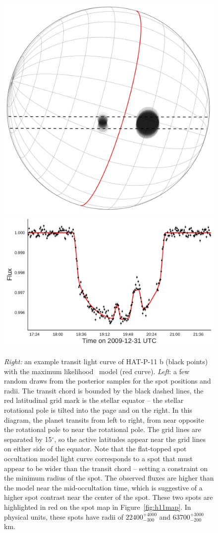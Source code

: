 \begin{figure}
\centering
\includegraphics[scale=0.4]{stsp_hat_p_11/transit044.pdf}
\includegraphics[scale=0.45]{stsp_hat_p_11/lc_044.pdf}
\caption{\textit{Right:} an example transit light curve of HAT-P-11 b (black points) with the maximum likelihood \stsp\ model (red curve). \textit{Left}: a few random draws from the posterior samples for the spot positions and radii. The transit chord is bounded by the black dashed lines, the red latitudinal grid mark is the stellar equator -- the stellar rotational pole is tilted into the page and on the right. In this diagram, the planet transits from left to right, from near opposite the rotational pole to near the rotational pole. The grid lines are separated by 15$^\circ$, so the active latitudes appear near the grid lines on either side of the equator. Note that the flat-topped spot occultation model light curve corresponds to a spot that must appear to be wider than the transit chord -- setting a constraint on the minimum radius of the spot. The observed fluxes are higher than the model near the mid-occultation time, which is suggestive of a higher spot contrast near the center of the spot. These two spots are highlighted in red on the spot map in Figure~\ref{fig:h11map}. In physical units, these spots have radii of $22400^{+4000}_{-300}$ and $63700^{+3000}_{-200}$ km.}

\end{figure}
